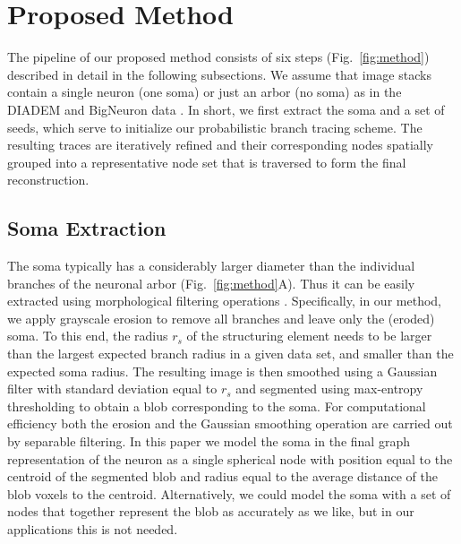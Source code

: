 \section{Proposed Method}
\label{sec:method}

The pipeline of our proposed method consists of six steps (Fig.~\ref{fig:method}) described in detail in the following subsections. We assume that image stacks contain a single neuron (one soma) or just an arbor (no soma) as in the DIADEM \cite{brown2011diadem} and BigNeuron data \cite{peng2015bigneuron}. In short, we first extract the soma and a set of seeds, which serve to initialize our probabilistic branch tracing scheme. The resulting traces are iteratively refined and their corresponding nodes spatially grouped into a representative node set that is traversed to form the final reconstruction.

\subsection{Soma Extraction}
\label{subsec:soma-extraction}
The soma typically has a considerably larger diameter than the individual branches of the neuronal arbor (Fig.~\ref{fig:method}A). Thus it can be easily extracted using morphological filtering operations \cite{yan2013automated}. Specifically, in our method, we apply grayscale erosion to remove all branches and leave only the (eroded) soma. To this end, the radius $r_s$ of the structuring element needs to be larger than the largest expected branch radius in a given data set, and smaller than the expected soma radius. The resulting image is then smoothed using a Gaussian filter with standard deviation equal to $r_s$ and segmented using max-entropy thresholding \cite{radojevic2016fuzzy} to obtain a blob corresponding to the soma. For computational efficiency both the erosion and the Gaussian smoothing operation are carried out by separable filtering. In this paper we model the soma in the final graph representation of the neuron as a single spherical node with position equal to the centroid of the segmented blob and radius equal to the average distance of the blob voxels to the centroid. Alternatively, we could model the soma with a set of nodes that together represent the blob as accurately as we like, but in our applications this is not needed.

